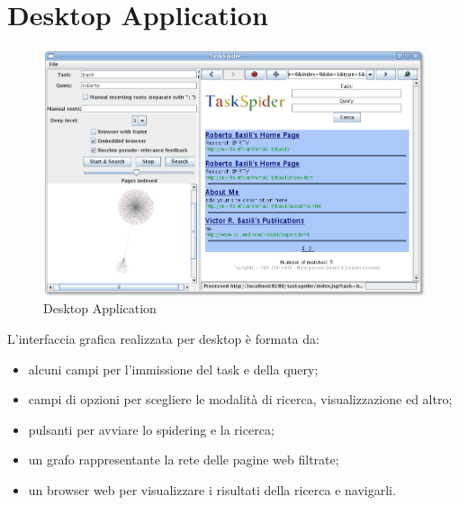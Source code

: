 \section{Desktop Application}
\begin{figure}[htb]
\begin{center}
\includegraphics[scale=0.4]{etc/taskspider.png}
\caption{Desktop Application}
\label{desktopApp}
\end{center}
\end{figure}
L'interfaccia grafica realizzata per desktop è formata da:
\begin{itemize}
\item alcuni campi per l'immissione del task e della query;
\item campi di opzioni per scegliere le modalità di ricerca, visualizzazione ed altro;
\item pulsanti per avviare lo spidering e la ricerca;
\item un grafo rappresentante la rete delle pagine web filtrate;
\item un browser web per visualizzare i risultati della ricerca e navigarli.
\end{itemize}
